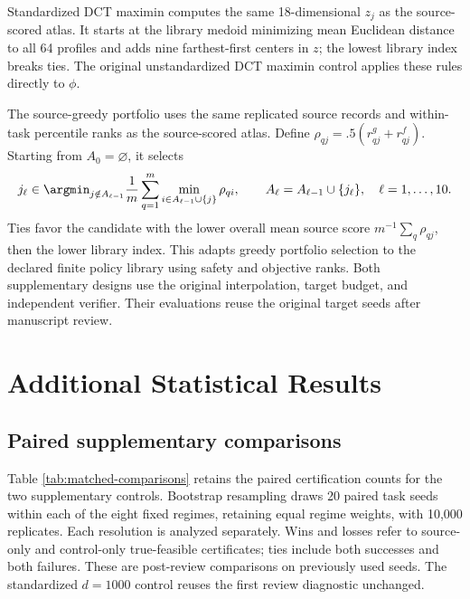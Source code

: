 Standardized DCT maximin computes the same 18-dimensional $z_j$ as the
source-scored atlas.  It starts at the library medoid minimizing mean
Euclidean distance to all 64 profiles and adds nine farthest-first centers in
$z$; the lowest library index breaks ties.  The original unstandardized DCT
maximin control applies these rules directly to $\phi$.

The source-greedy portfolio uses the same replicated source records and
within-task percentile ranks as the source-scored atlas.  Define
$\rho_{qj}=.5(r^g_{qj}+r^f_{qj})$.  Starting from $A_0=\varnothing$, it selects
\begin{equation}\label{eq:greedy-portfolio}
 j_\ell\in\argmin_{j\notin A_{\ell-1}}
 \frac1m\sum_{q=1}^{m}\min_{i\in A_{\ell-1}\cup\{j\}}\rho_{qi},
 \qquad A_\ell=A_{\ell-1}\cup\{j_\ell\},\quad \ell=1,\ldots,10.
\end{equation}
Ties favor the candidate with the lower overall mean source score
$m^{-1}\sum_q\rho_{qj}$, then the lower library index.  This adapts greedy
portfolio selection \citep{FeurerEtAl2022} to the declared finite policy
library using safety and objective ranks.
Both supplementary designs use the original interpolation, target budget,
and independent verifier.  Their evaluations reuse the original target seeds
after manuscript review.

\section{Additional Statistical Results}\label{app:additional-results}

\subsection{Paired supplementary comparisons}

Table \ref{tab:matched-comparisons} retains the paired certification counts
for the two supplementary controls.  Bootstrap resampling draws 20 paired
task seeds within each of the eight fixed regimes, retaining equal regime
weights, with 10,000 replicates.  Each resolution is analyzed separately.
Wins and losses refer to source-only and control-only true-feasible
certificates; ties include both successes and both failures.  These are
post-review comparisons on previously used seeds.  The standardized $d=1000$
control reuses the first review diagnostic unchanged.

\begin{table}[htbp]
\centering
\small
\caption{Source-scored atlas minus supplementary controls in true-feasible
certification.  Differences and intervals are in percentage points.}
\label{tab:matched-comparisons}
\resizebox{\textwidth}{!}{}
\end{table}


